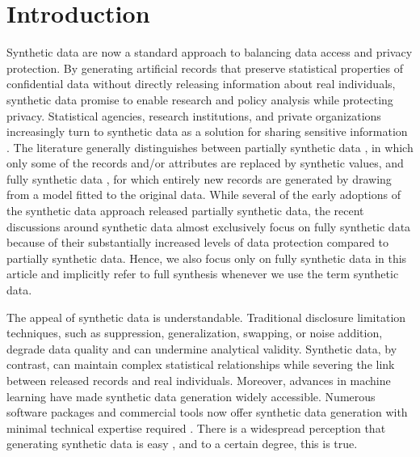 \documentclass[Afour,sageh,times,doublespace]{sagej}
\begin{document}

\section{Introduction}

Synthetic data are now a standard approach to balancing data access and privacy protection. By generating artificial records that preserve statistical properties of confidential data without directly releasing information about real individuals, synthetic data promise to enable research and policy analysis while protecting privacy. Statistical agencies, research institutions, and private organizations increasingly turn to synthetic data as a solution for sharing sensitive information  \citep{Rubin1993, Drechsler2011, hu2024advancing,drechsler202430}. The literature generally distinguishes between partially synthetic data \citep{little1993statistical}, in which only some of the records and/or attributes are replaced by synthetic values, and fully synthetic data \citep{Rubin1993}, for which entirely new records are generated by drawing from a model fitted to the original data. While several of the early adoptions of the synthetic data approach released partially synthetic data, the recent discussions around synthetic data almost exclusively focus on fully synthetic data because of their substantially increased levels of data protection compared to partially synthetic data. Hence, we also focus only on fully synthetic data in this article and implicitly refer to full synthesis whenever we use the term synthetic data.

The appeal of synthetic data is understandable. Traditional disclosure limitation techniques, such as suppression, generalization, swapping, or noise addition, degrade data quality and can undermine analytical validity. Synthetic data, by contrast, can maintain complex statistical relationships while severing the link between released records and real individuals. Moreover, advances in machine learning have made synthetic data generation widely accessible. Numerous software packages and commercial tools now offer synthetic data generation with minimal technical expertise required \citep{Nowok2016, Ping2017}. There is a widespread perception that generating synthetic data is easy \citep{Latner2024}, and to a certain degree, this is true.
\end{document}
